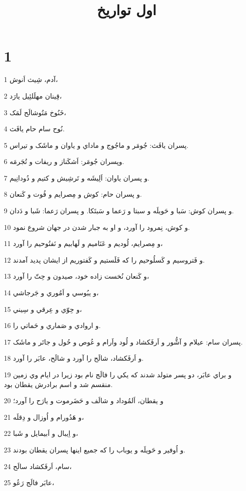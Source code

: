 

\title{اول تواريخ}

 
\chapter{1}

\par 1 آدم، شِيث اَنوش،
\par 2 قِينان مهلَلئِيل يارَد،
\par 3 خَنُوخ مَتُوشالَح لَمَک،
\par 4 نُوح سام حام يافَث.
\par 5 پسران يافَث: جُومَر و ماجُوج و ماداي و ياوان و ماشَک و تيراس.
\par 6 وپسران جُومَر: اَشکَناز و ريفات و تُجَرمَه.
\par 7 و پسران ياوان: اَلِيشَه و تَرشِيش و کتيم و دُودانِيم.
\par 8 و پسران حام: کوش و مِصرايم و فُوت و کَنعان.
\par 9 و پسران کوش: سَبا و حَويلَه و سبتا و رَعما و سَبتَکا. و پسران رَعما: شَبا و دَدان.
\par 10 و کوش، نِمرود را آورد، و او به جبار شدن در جهان شروع نمود.
\par 11 و مِصرايم، لُوديم و عَنَاميم و لَهابيم و نَفتُوحيم را آورد،
\par 12 و فَتروسيم و کَسلُوحيم را که فَلَستيم و کَفتوريم از ايشان پديد آمدند.
\par 13 و کَنعان نُخست زاده خود، صيدون و حِتّ را آورد،
\par 14 و يبُوسي و اَمُوري و جَرجاشي،
\par 15 و حِوّي و عِرقي و سِيني،
\par 16 و اروادي و صَماري و حَماتي را.
\par 17 پسران سام: عيلام و آشُّور و اَرفَکشاد و لُود واَرام و عُوص و حُول و جاتَر و ماشَک.
\par 18 و اَرفَکشاد، شالَح را آورد و شالَح، عابَر را آورد.
\par 19 و براي عابَر، دو پسر متولد شدند که يکي را فالَج نام بود زيرا در ايام وي زمين منقسم شد و اسم برادرش يقطان بود.
\par 20 و يقطان، اَلمُوداد و شالَف و حَضَرموت و يارَح را آورد؛
\par 21 و هَدُورام و اُوزال و دِقلَه،
\par 22 و اِيبال و اَبيمايل و شَبا،
\par 23 و اُوفير و حَويلَه و يوباب را که جميع اينها پسران يقطان بودند.
\par 24 سام، اَرفَکشاد سالَح،
\par 25 عابَر فالَج رَعُو،
